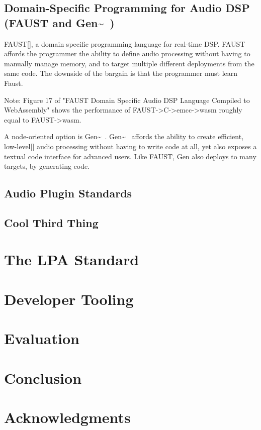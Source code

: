 \documentclass[a4paper]{article}
\begin{document}
\subsection{Domain-Specific Programming for Audio DSP (FAUST and Gen\~~)}
FAUST[], a domain specific programming language for real-time DSP. 
FAUST affords the programmer the ability to define audio processing without having to manually manage memory, and to target multiple different deployments from the same code. 
The downside of the bargain is that the programmer must learn Faust.

Note: Figure 17 of "FAUST Domain Specific Audio DSP Language Compiled to WebAssembly" shows the performance of FAUST->C->emcc->wasm roughly equal to FAUST->wasm.

A node-oriented option is Gen\~~. 
Gen\~~ affords the ability to create efficient, low-level[] audio processing without having to write code at all, yet also exposes a textual code interface for advanced users. 
Like FAUST, Gen also deploys to many targets, by generating code.

\subsection{Audio Plugin Standards}
\subsection{Cool Third Thing}

\section{The LPA Standard}

\section{Developer Tooling}

\section{Evaluation}

\section{Conclusion}

\section{Acknowledgments}
\end{document}
